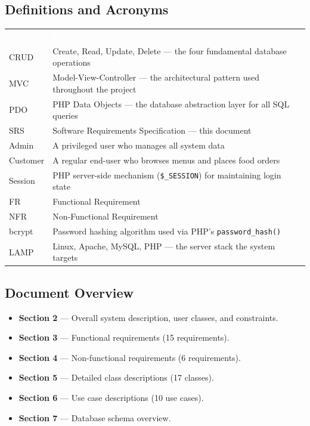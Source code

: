 \documentclass[12pt,a4paper]{article}
\newcommand{\thead}[1]{\textbf{\textcolor{white}{#1}}}
\newcommand{\code}[1]{\texttt{\footnotesize\colorbox{codebg}{#1}}}
\begin{document}
\subsection{Definitions and Acronyms}

\begin{tabularx}{\linewidth}{@{} L{2.8cm} X @{}}
  \thead{Term} & \thead{Definition} \\
  CRUD    & Create, Read, Update, Delete --- the four fundamental database operations \\
  MVC     & Model-View-Controller --- the architectural pattern used throughout the project \\
  PDO     & PHP Data Objects --- the database abstraction layer for all SQL queries \\
  SRS     & Software Requirements Specification --- this document \\
  Admin   & A privileged user who manages all system data \\
  Customer & A regular end-user who browses menus and places food orders \\
  Session & PHP server-side mechanism (\code{\$\_SESSION}) for maintaining login state \\
  FR      & Functional Requirement \\
  NFR     & Non-Functional Requirement \\
  bcrypt  & Password hashing algorithm used via PHP's \code{password\_hash()} \\
  LAMP    & Linux, Apache, MySQL, PHP --- the server stack the system targets \\
\end{tabularx}

\subsection{Document Overview}

\begin{itemize}[leftmargin=1.5em, itemsep=2pt]
  \item \textbf{Section 2} --- Overall system description, user classes, and constraints.
  \item \textbf{Section 3} --- Functional requirements (15 requirements).
  \item \textbf{Section 4} --- Non-functional requirements (6 requirements).
  \item \textbf{Section 5} --- Detailed class descriptions (17 classes).
  \item \textbf{Section 6} --- Use case descriptions (10 use cases).
  \item \textbf{Section 7} --- Database schema overview.
\end{itemize}
\end{document}
